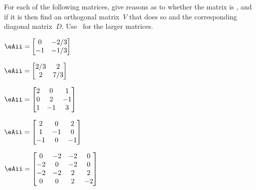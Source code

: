 \begin{exercise} \label{ex:} 
For each of the following matrices, give reasons as to whether the matrix is , and if it is then find an orthogonal matrix~\(V\) that does so and the corresponding diagonal matrix~\(D\).
Use \script\ for the larger matrices.

\begin{parts}
\item \(\eAii=\begin{bmatrix} 0&-2/3
\\-1&-1/3 \end{bmatrix}\)

\item \(\eAii=\begin{bmatrix} 2/3&2
\\2&7/3 \end{bmatrix}\)

\item \(\eAii=\begin{bmatrix} 2&0&1
\\0&2&-1
\\1&-1&3 \end{bmatrix}\)

\item \(\eAii=\begin{bmatrix} 2&0&2
\\1&-1&0
\\-1&0&-1 \end{bmatrix}\)

\item \(\eAii=\begin{bmatrix} 0&-2&-2&0
\\-2&0&-2&0
\\-2&-2&2&2
\\0&0&2&-2 \end{bmatrix}\)


\end{parts}
\end{exercise}
